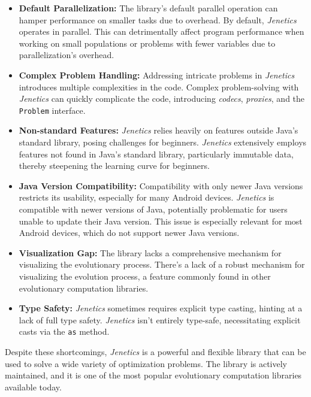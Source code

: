 \begin{itemize}
    \item \textbf{Default Parallelization:} The library's default parallel  
      operation can hamper performance on smaller tasks due to overhead.
      By default, \textit{Jenetics} operates in parallel.
      This can detrimentally affect program performance when working on small 
      populations or problems with fewer variables due to parallelization's 
      overhead.
    \item \textbf{Complex Problem Handling:} Addressing intricate problems in 
      \textit{Jenetics} introduces multiple complexities in the code.
      Complex problem-solving with \textit{Jenetics} can quickly complicate the 
      code, introducing \textit{codecs}, \textit{proxies}, and the 
      \texttt{Problem} interface.
    \item \textbf{Non-standard Features:} \textit{Jenetics} relies heavily on 
      features outside Java's standard library, posing challenges for beginners.
      \textit{Jenetics} extensively employs features not found in Java's 
      standard library, particularly immutable data, thereby steepening the 
      learning curve for beginners.
    \item \textbf{Java Version Compatibility:} Compatibility with only newer 
      Java versions restricts its usability, especially for many Android 
      devices.
      \textit{Jenetics} is compatible with newer versions of Java, potentially 
      problematic for users unable to update their Java version. This issue is 
      especially relevant for most Android devices, which do not support newer 
      Java versions.
    \item \textbf{Visualization Gap:} The library lacks a comprehensive   
      mechanism for visualizing the evolutionary process.
      There's a lack of a robust mechanism for visualizing the evolution 
      process, a feature commonly found in other evolutionary computation 
      libraries.
    \item \textbf{Type Safety:} \textit{Jenetics} sometimes requires explicit 
      type casting, hinting at a lack of full type safety.
      \textit{Jenetics} isn't entirely type-safe, necessitating explicit casts 
      via the \texttt{as} method.
  \end{itemize}

  Despite these shortcomings, \textit{Jenetics} is a powerful and flexible
  library that can be used to solve a wide variety of optimization problems.
  The library is actively maintained, and it is one of the most popular
  evolutionary computation libraries available today.
